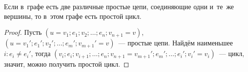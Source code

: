 \begin{lemma}
Если в~графе есть две различные простые цепи, соединяющие одни и~те~же вершины, то в~этом графе есть простой цикл.
\end{lemma}
\begin{proof}
Пусть $(u = v_1; e_1; v_2; \ldots; e_n; v_{n+1} = v)$, $(u = v_1'; e_1'; v_2'; \ldots; e_m'; v_{m+1}' = v)$~--- простые цепи.
Найдём наименьшее~$i \colon e_i \neq e_i'$, тогда $(v_i; e_i; v_{i+1}; \ldots; e_n; v_{n+1} = v_{m+1}'; e_m'; \ldots; e_i'; v_i' = v_i)$~--- цикл, значит, можно получить простой цикл.
\end{proof}